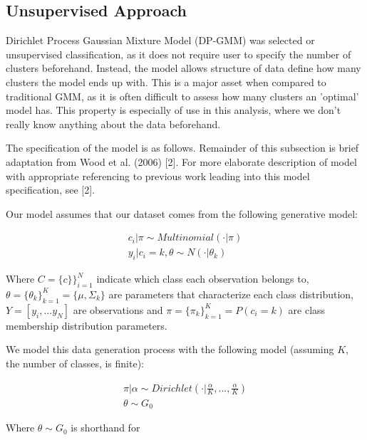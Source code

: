 \documentclass[a4paper]{article}
\begin{document}
\subsection{Unsupervised Approach}

Dirichlet Process Gaussian Mixture Model (DP-GMM) was selected or unsupervised classification, as it does not require user to specify the number of clusters beforehand. Instead, the model allows structure of data define how many clusters the model ends up with. This is a major asset when compared to traditional GMM,  as it is often difficult to assess how many clusters an 'optimal' model has. This property is especially of use in this analysis, where we don't really know anything about the data beforehand.

The specification of the model is as follows. Remainder of this subsection is  brief adaptation from Wood et al. (2006) [2]. For more elaborate description of model with appropriate referencing to previous work leading into this model specification, see [2]. 

 Our model assumes that our dataset comes from the following generative model:
 
 \begin{equation}
 \begin{aligned}
 	c_i | \pi \sim Multinomial(\cdot | \pi) \\
	y_i | c_i = k, \theta \sim N(\cdot | \theta_k)
 \end{aligned}
 \end{equation}
 
Where $C=\{c\}\}^{N}_{i=1}$ indicate which class each observation belongs to, $\theta=\{\theta_k\}^K_{k=1}=\{\mu, \Sigma_{k}\}$ are parameters that characterize each class distribution, $Y=[y_i, ... y_N]$ are observations and $\pi=\{\pi_k\}^K_{k=1}=P(c_i=k)$ are class membership distribution parameters.

We model this data generation process with the following model (assuming $K$, the number of classes, is finite):

 \begin{equation}
 \begin{aligned}
	\pi | \alpha \sim Dirichlet(\cdot | \frac{\alpha}{K}, ... , \frac{\alpha}{K}) \\
 	\theta \sim G_0
 \end{aligned}
\end{equation}

Where $\theta \sim G_0$ is shorthand for
\end{document}
